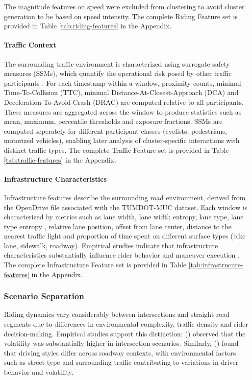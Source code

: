 The magnitude features on speed were excluded from clustering to avoid cluster generation to be based on speed intensity. The complete Riding Feature set is provided in Table \ref{tab:riding-features} in the Appendix.

\paragraph{Traffic Context}
\label{meth:traffic}
The surrounding traffic environment is characterized using surrogate safety measures (SSMs), which quantify the operational risk posed by other traffic participants \cite{wang_review_2021}. For each timestamp within a window, proximity counts, minimal Time-To-Collision (TTC), minimal Distance-At-Closest-Approach (DCA) and Deceleration-To-Avoid-Crash (DRAC) are computed relative to all participants.
These measures are aggregated across the window to produce statistics such as mean, maximum, percentile thresholds and exposure fractions. SSMs are computed seperately for different participant classes (cyclists, pedestrians, motorized vehicles), enabling later analysis of cluster-specific interactions with distinct traffic types. The complete Traffic Feature set is provided in Table \ref{tab:traffic-features} in the Appendix.


\paragraph{Infrastructure Characteristics}
Infrastructure features describe the surrounding road environment, derived from the OpenDrive file associated with the TUMDOT-MUC dataset. Each window is characterized by metrics such as lane width, lane width entropy, lane type, lane type entropy \cite{bachir_identifying_2025}, relative lane position, offset from lane center, distance to the nearest traffic light and proportion of time spent on different surface types (bike lane, sidewalk, roadway). Empirical studies indicate that infrastructure characteristics substantially influence rider behavior and maneuver execution \cite{belikhov_exploring_2025, wang_investigating_2022, gossling_subjectively_2022}. The complete Infrastructure Feature set is provided in Table \ref{tab:infrastrucure-features} in the Appendix.



\subsubsection{Scenario Separation}
Riding dynamics vary considerably between intersections and straight road segments due to differences in environmental complexity, traffic density and rider decision-making. Empirical studies support this distinction: \citeauthor{li_volatility-based_2025} (\citeyear{li_volatility-based_2025}) observed that the volatility was substantially higher in intersection scenarios. Similarly, \citeauthor{mohammadnazar_classifying_2021} (\citeyear{mohammadnazar_classifying_2021}) found that driving styles differ across roadway contexts, with environmental factors such as street type and surrounding traffic contributing to variations in driver behavior and volatility.  


